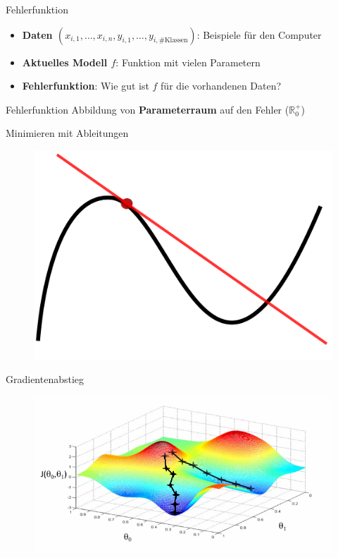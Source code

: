 \begin{frame}{Fehlerfunktion}
    \begin{itemize}[<+->]
        \item \textbf{Daten $(x_{i,1}, \dots, x_{i,n}, y_{i,1}, \dots, y_{i,\text{\# Klassen}})$}: Beispiele für den Computer
        \item \textbf{Aktuelles Modell $f$}: Funktion mit vielen Parametern
        \item \textbf{Fehlerfunktion}: Wie gut ist $f$ für die vorhandenen
              Daten?
    \end{itemize}
\end{frame}

\begin{frame}{Fehlerfunktion}
    Abbildung von \textbf{Parameterraum} auf den Fehler ($\mathbb{R}_0^+$)
\end{frame}

\begin{frame}{Minimieren mit Ableitungen}
    \begin{figure}[h]
        \centering
        \includegraphics*[width=0.7\linewidth, keepaspectratio]{images/derivative-function.png}
    \end{figure}
\end{frame}

\begin{frame}{Gradientenabstieg}
    \begin{figure}[h]
        \centering
        \includegraphics*[width=0.7\linewidth, keepaspectratio]{images/gradient-descent.png}
    \end{figure}
\end{frame}


